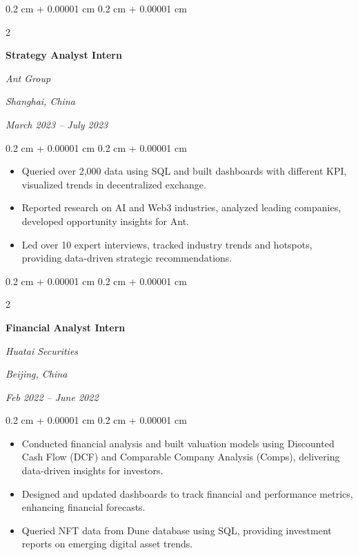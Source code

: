 \documentclass[10pt, letterpaper]{article}
\newenvironment{highlights}{
    \begin{itemize}[
        topsep=0.05 cm,
        parsep=0.05 cm,
        partopsep=0pt,
        itemsep=0pt,
        leftmargin=0.4 cm + 10pt
    ]
}{
    \end{itemize}
} %
\newenvironment{onecolentry}{
    \begin{adjustwidth}{
        0.2 cm + 0.00001 cm
    }{
        0.2 cm + 0.00001 cm
    }
}{
    \end{adjustwidth}
} %
\newenvironment{twocolentry}[2][]{
    \onecolentry
    \def\secondColumn{#2}
    \setcolumnwidth{\fill, 4.5 cm}
    \begin{paracol}{2}
}{
    \switchcolumn \raggedleft \secondColumn
    \end{paracol}
    \endonecolentry
} %
\begin{document}
        \begin{twocolentry}{
        \textit{Shanghai, China}    
            
        \textit{March 2023 – July 2023}}
            \textbf{Strategy Analyst Intern}
            
            \textit{Ant Group}
            
        \end{twocolentry}

        \vspace{0.10 cm}
        \begin{onecolentry}
            \begin{highlights}
                \item Queried over 2,000 data using SQL and built dashboards with different KPI, visualized trends in decentralized exchange.
                \item Reported research on AI and Web3 industries, analyzed leading companies, developed opportunity insights for Ant.  
                \item Led over 10 expert interviews, tracked industry trends and hotspots, providing data-driven strategic recommendations.
            \end{highlights}
        \end{onecolentry}


        \vspace{0.2 cm}

        \begin{twocolentry}{
        \textit{Beijing, China}    
            
        \textit{Feb 2022 – June 2022}}
            \textbf{Financial Analyst Intern}
            
            \textit{Huatai Securities}
        \end{twocolentry}

        \vspace{0.10 cm}
        \begin{onecolentry}
            \begin{highlights}
                \item Conducted financial analysis and built valuation models using Discounted Cash Flow (DCF) and Comparable Company Analysis (Comps), delivering data-driven insights for investors.
                \item Designed and updated dashboards to track financial and performance metrics, enhancing financial forecasts.
                \item Queried NFT data from Dune database using SQL, providing investment reports on emerging digital asset trends.
            \end{highlights}
        \end{onecolentry}
\end{document}
